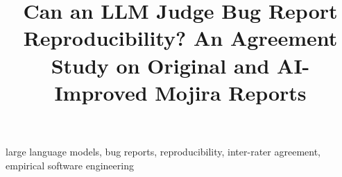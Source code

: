 \documentclass[conference, onecolumn]{IEEEtran}
\begin{document}
\title{Can an LLM Judge Bug Report Reproducibility? An Agreement Study on Original and AI-Improved Mojira Reports}
\author{
}

\maketitle

\begin{abstract}

\end{abstract}

\begin{IEEEkeywords}
large language models, bug reports, reproducibility, inter-rater agreement, empirical software engineering
\end{IEEEkeywords}











\end{document}
